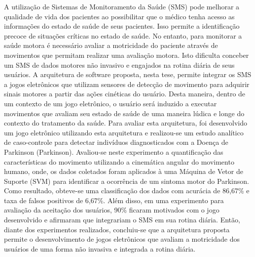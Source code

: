 A utilização de Sistemas de Monitoramento da Saúde (SMS) pode melhorar a qualidade de vida dos pacientes ao possibilitar que o médico tenha acesso as informações do estado de saúde de seus pacientes. Isso permite a identificação precoce de situações críticas no estado de saúde.
No entanto, para monitorar a saúde motora é necessário avaliar a motricidade do paciente através de movimentos que permitam realizar uma avaliação motora.  Isto dificulta conceber um SMS de dados motores não invasivo e engajados na rotina diária de seus usuários. A arquitetura de software proposta, nesta tese, permite integrar os SMS a jogos eletrônicos que utilizam sensores de detecção de movimento para adquirir sinais motores a partir das ações cinéticas do usuário. Desta maneira, dentro de um contexto de um jogo eletrônico, o usuário será induzido a executar movimentos que avaliam seu estado de saúde de uma maneira lúdica e longe do contexto do tratamento da saúde. Para avaliar esta arquitetura, foi desenvolvido um jogo eletrônico utilizando esta arquitetura e realizou-se um estudo analítico de caso-controle para detectar indivíduos diagnosticados com a Doença de Parkinson (Parkinson). Avaliou-se neste experimento a quantificação das características do movimento utilizando a cinemática angular do movimento humano, onde, os dados coletados foram aplicados à uma Máquina de Vetor de Suporte (SVM) para identificar a ocorrência de um sintoma motor do Parkinson. Como resultado, obteve-se uma classificação dos dados com acurácia de 86,67\% e taxa de falsos positivos de 6,67\%. Além disso, em uma experimento para avaliação da aceitação dos usuários, 90\% ficaram motivados com o jogo desenvolvido e afirmaram que integrariam o SMS em sua rotina diária. Então, diante dos experimentos realizados, concluiu-se que a arquitetura proposta permite o desenvolvimento de jogos eletrônicos que avaliam a motricidade dos usuários de uma forma não invasiva e integrada a rotina diária. 



